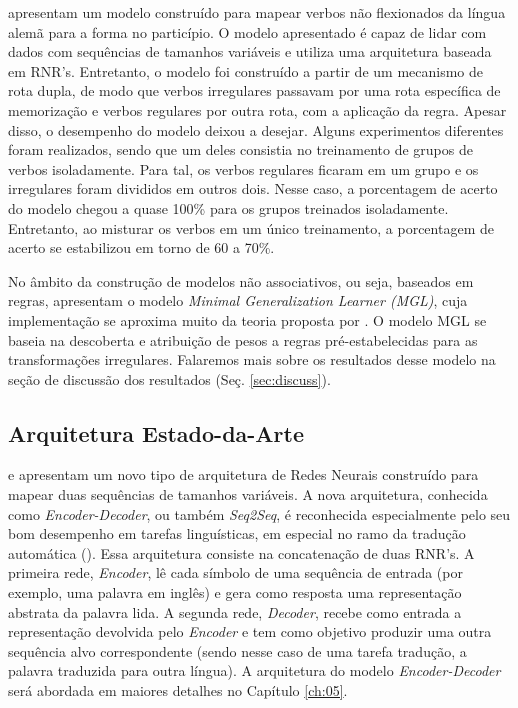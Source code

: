 \cite{wetermann:1997} apresentam um modelo construído para mapear verbos não flexionados da língua alemã para a forma no particípio. O modelo apresentado é capaz de lidar com dados com sequências de tamanhos variáveis e utiliza uma arquitetura baseada em RNR's. Entretanto, o modelo foi construído a partir de um mecanismo de rota dupla, de modo que verbos irregulares passavam por uma rota específica de memorização e verbos regulares por outra rota, com a aplicação da regra. Apesar disso, o desempenho do modelo deixou a desejar. Alguns experimentos diferentes foram realizados, sendo que um deles consistia no treinamento de grupos de verbos isoladamente. Para tal, os verbos regulares ficaram em um grupo e os irregulares foram divididos em outros dois. Nesse caso, a porcentagem de acerto do modelo chegou a quase 100\% para os grupos treinados isoladamente. Entretanto, ao misturar os verbos em um único treinamento, a porcentagem de acerto se estabilizou em torno de 60 a 70\%.  

No âmbito da construção de modelos não associativos, ou seja, baseados em regras, \cite{Albright2003RulesVA} apresentam o modelo \textit{Minimal Generalization Learner (MGL)}, cuja implementação se aproxima muito da teoria proposta por \cite{Pinker:1988}. O modelo MGL se baseia na descoberta e atribuição de pesos a regras pré-estabelecidas para as transformações irregulares. Falaremos mais sobre os resultados desse modelo na seção de discussão dos resultados (Seç. \ref{sec:discuss}).

\subsection{Arquitetura Estado-da-Arte}

\cite{enc-dec:2014} e \cite{seq2seq:2014} apresentam um novo tipo de arquitetura de Redes Neurais construído para mapear duas sequências de tamanhos variáveis. A nova arquitetura, conhecida como \textit{Encoder-Decoder}, ou também \textit{Seq2Seq}, é reconhecida especialmente pelo seu bom desempenho em tarefas linguísticas, em especial no ramo da tradução automática (\cite{Wu:2016}). Essa arquitetura consiste na concatenação de duas RNR's. A primeira rede, \textit{Encoder}, lê cada símbolo de uma sequência de entrada (por exemplo, uma palavra em inglês) e gera como resposta uma representação abstrata da palavra lida. A segunda rede, \textit{Decoder}, recebe como entrada a representação devolvida pelo \textit{Encoder} e tem como objetivo produzir uma outra sequência alvo correspondente (sendo nesse caso de uma tarefa tradução, a palavra traduzida para outra língua). A arquitetura do modelo \textit{Encoder-Decoder} será abordada em maiores detalhes no Capítulo \ref{ch:05}.

